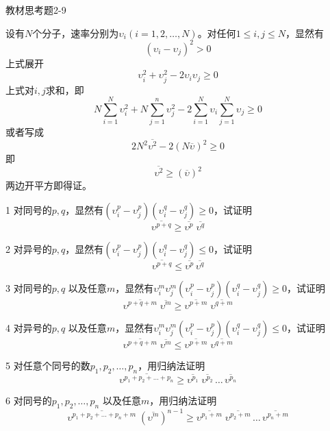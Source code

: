 \documentclass[CJK]{beamer}
\begin{document}
\begin{frame}
\bch
{\blue 教材思考题2-9}

{\scriptsize
设有$N$个分子，速率分别为$\upsilon_i (i = 1, 2, \ldots, N)$。对任何$1\le i, j\le N$，显然有
$$(\upsilon_i - \upsilon_j)^2 > 0$$
上式展开
$$ \upsilon_i^2 +  \upsilon_j^2 - 2 \upsilon_i\upsilon_j \ge 0$$
上式对$i, j$求和，即
$$ N \sum_{i=1}^N \upsilon_i^2 + N \sum_{j=1}^n \upsilon_j^2  - 2\sum_{i=1}^N \upsilon_i \sum_{j=1}^N\upsilon_j \ge 0$$
或者写成
$$2 N^2 \overline{\upsilon^2} - 2\left(N\overline{\upsilon}\right)^2 \ge 0$$
即 
$$ \overline{\upsilon^2} \ge \left(\overline{\upsilon}\right)^2 $$
两边开平方即得证。
}

\ech
\end{frame}

\begin{frame}
\bch
{\scriptsize
\bitem
\item[1]{对同号的$p, q$，显然有$(\upsilon_i^p - \upsilon_j^p)(\upsilon_i^q - \upsilon_j^q) \ge 0$，试证明
$$\overline{\upsilon^{p+q}} \ge \overline{\upsilon^p}\; \overline{\upsilon^q} $$}
\item[2]{
对异号的$p, q$，显然有$(\upsilon_i^p - \upsilon_j^p)(\upsilon_i^q - \upsilon_j^q) \le 0$，试证明
$$\overline{\upsilon^{p+q}} \le \overline{\upsilon^p}\,\overline{\upsilon^q} $$}
\item[3]{对同号的$p, q$ 以及任意$m$，显然有$\upsilon_i^m\upsilon_j^m(\upsilon_i^p - \upsilon_j^p)(\upsilon_i^q - \upsilon_j^q) \ge 0$，试证明
$$\overline{\upsilon^{p+q+m}} \;\overline{\upsilon^{m}} \ge \overline{\upsilon^{p+m}}\; \overline{\upsilon^{q+m}} $$}
\item[4]{对异号的$p, q$ 以及任意$m$，显然有$\upsilon_i^m\upsilon_j^m(\upsilon_i^p - \upsilon_j^p)(\upsilon_i^q - \upsilon_j^q) \le 0$，试证明
$$\overline{\upsilon^{p+q+m}} \;\overline{\upsilon^{m}} \le \overline{\upsilon^{p+m}}\; \overline{\upsilon^{q+m}} $$}
\item[5]{对任意个同号的数$p_1, p_2, \ldots, p_n$，用归纳法证明
$$\overline{\upsilon^{p_1+p_2+\ldots+p_n}} \ge \overline{\upsilon^{p_1}}\; \overline{\upsilon^{p_2}}\, \ldots\,\overline{\upsilon^{p_n}} $$
}
\item[6]{对同号的$p_1,p_2,\ldots, p_n$ 以及任意$m$，用归纳法证明
$$\overline{\upsilon^{p_1+p_2+\ldots+p_n+m}}\; \left(\overline{\upsilon^m}\right)^{n-1}  \ge \overline{\upsilon^{p_1+m}}\; \overline{\upsilon^{p_2+m}}\, \ldots\,\overline{\upsilon^{p_n+m}} $$
}
\eitem
}
\ech
\end{frame}
\end{document}
